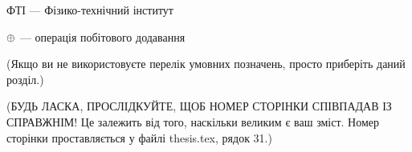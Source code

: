 ФТІ --- Фізико-технічний інститут

$\oplus$ --- операція побітового додавання  %


(Якщо ви не використовуєте перелік умовних позначень, просто приберіть
даний розділ.)

(БУДЬ ЛАСКА, ПРОСЛІДКУЙТЕ, ЩОБ НОМЕР СТОРІНКИ СПІВПАДАВ ІЗ СПРАВЖНІМ! Це залежить від того, наскільки великим є ваш зміст.
Номер сторінки проставляється у файлі thesis.tex, рядок 31.)
